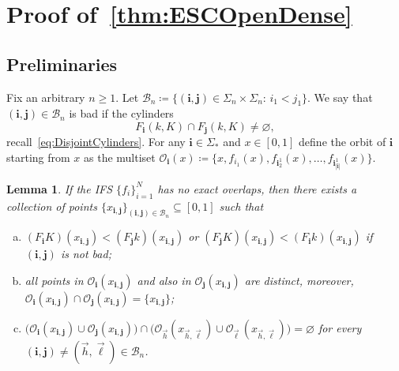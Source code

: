 \documentclass[12pt,]{article}
\def\cref#1{\ref{#1}}%
\newtheorem{lemma}[theorem]{Lemma}
\theoremstyle{definition}
\theoremstyle{remark}
\newcommand{\0}{\mathbf{0}}
\newcommand{\bi}{\mathbf{i}}
\newcommand{\bj}{\mathbf{j}}
\begin{document}
{%
\section{Proof of~\cref{thm:ESCOpenDense}}\label{sec:ProofESCOpenDense}

\subsection{Preliminaries}

Fix an arbitrary $n\geq 1$. Let $\mathcal{B}_n\coloneqq\{(\bi,\bj)\in\Sigma_n\times\Sigma_n:\,
i_1<j_1\}$. We say that $(\bi,\bj)\in\mathcal{B}_n$ is bad if the cylinders
\begin{equation}\label{eq:DefBad}
F_{\bi}(k,K)\cap F_{\bj}(k,K)\neq\varnothing,
\end{equation}
recall~\cref{eq:DisjointCylinders}. For any $\bi\in\Sigma_*$ and $x\in[0,1]$ define the orbit of
$\bi$ starting from $x$ as the multiset $\mathcal{O}_{\bi}(x)\coloneqq \{x,f_{i_1}(x),
f_{\bi_2^1}(x),\ldots,f_{\bi_{|\bi|}^1}(x)\}$. 


\begin{lemma}\label{lem:Pointsx_ij}
If the IFS $\{f_i\}_{i=1}^N$ has no exact overlaps, then there exists a collection of points
$\{x_{\bi,\bj}\}_{(\bi,\bj)\in\mathcal{B}_n}\subseteq[0,1]$ such that
\begin{enumerate}[(a)]
\item $(F_{\bi}K)(x_{\bi,\bj}) < (F_{\bj}k)(x_{\bi,\bj})$ or $(F_{\bj}K)(x_{\bi,\bj}) <
  (F_{\bi}k)(x_{\bi,\bj})$ if $(\bi,\bj)$ is not bad;  
\item all points in $\mathcal{O}_{\bi}(x_{\bi,\bj})$ and also in $\mathcal{O}_{\bj}(x_{\bi,\bj})$
  are distinct, moreover,
  $\mathcal{O}_{\bi}(x_{\bi,\bj})\cap\mathcal{O}_{\bj}(x_{\bi,\bj})=\{x_{\bi,\bj}\}$;
\item $\big(\mathcal{O}_{\bi}(x_{\bi,\bj})\cup \mathcal{O}_{\bj}(x_{\bi,\bj})\big) \cap
  \big(\mathcal{O}_{\vec{h}}(x_{\vec{h},\vec{\ell}})\cup
  \mathcal{O}_{\vec{\ell}}\,(x_{\vec{h},\vec{\ell}})\big)=\varnothing$ for every $(\bi,\bj)\neq
  (\vec{h},\vec{\ell})\in\mathcal{B}_n$.
\end{enumerate} 
\end{lemma}

}
\end{document}
